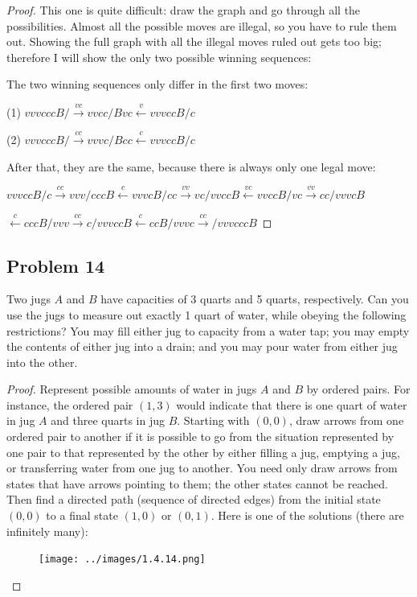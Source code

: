 \documentclass[14pt]{extarticle}
\newcommand{\from}{\leftarrow}
\begin{document}
\begin{proof}
    This one is quite difficult: draw the graph and go through all the
    possibilities. Almost all the possible moves are illegal, so you have to rule
    them out. Showing the full graph with all the illegal moves ruled out gets too
    big; therefore I will show the only two possible winning sequences:

    The two winning sequences only differ in the first two moves:

    (1) $vvvcccB/ \overset{vc}{\to} vvcc/Bvc \overset{v}{\from} vvvccB/c$

    (2) $vvvcccB/ \overset{cc}{\to} vvvc/Bcc \overset{c}{\from} vvvccB/c$

    After that, they are the same, because there is always only one legal move:

    $
        vvvccB/c \overset{cc}{\to} vvv/cccB \overset{c}{\from} vvvcB/cc
        \overset{vv}{\to} vc/vvccB \overset{vc}{\from} vvccB/vc \overset{vv}{\to}
        cc/vvvcB$

    $\overset{c}{\from} cccB/vvv \overset{cc}{\to} c/vvvccB
        \overset{c}{\from} ccB/vvvc \overset{cc}{\to} /vvvcccB$

\end{proof}

\subsection{Problem 14}
Two jugs $A$ and $B$ have capacities of 3 quarts and 5 quarts, respectively.
Can you use the jugs to measure out exactly 1 quart of water, while obeying the
following restrictions? You may fill either jug to capacity from a water tap;
you may empty the contents of either jug into a drain; and you may pour water
from either jug into the other.

\begin{proof}
    Represent possible amounts of water in jugs $A$ and $B$ by ordered
    pairs. For instance, the ordered pair $(1, 3)$ would indicate that there
    is one quart of water in jug $A$ and three quarts in jug $B$. Starting with
    $(0, 0)$, draw arrows from one ordered pair to another if it is possible to go
    from the situation represented by one pair to that represented by the other by
    either filling a jug, emptying a jug, or transferring water from one jug to
    another. You need only draw arrows from states that have arrows pointing to
    them; the other states cannot be reached. Then find a directed path (sequence of
    directed edges) from the initial state $(0, 0)$ to a final state $(1, 0)$ or
    $(0, 1)$. Here is one of the solutions (there are infinitely many):

    \begin{figure}[ht!]
        \centering
        \texttt{[image: ../images/1.4.14.png]}
    \end{figure}
\end{proof}
\end{document}
